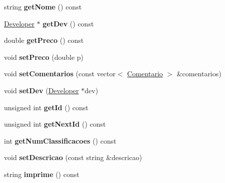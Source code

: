 \begin{DoxyCompactItemize}
\item 
\hypertarget{class_app_a7b94ca7878eb536a1d1b1448c2072bea}{string {\bfseries get\+Nome} () const }\label{class_app_a7b94ca7878eb536a1d1b1448c2072bea}

\item 
\hypertarget{class_app_a94de3c0569d8c300a634c5e058da70da}{\hyperlink{class_developer}{Developer} $\ast$ {\bfseries get\+Dev} () const }\label{class_app_a94de3c0569d8c300a634c5e058da70da}

\item 
\hypertarget{class_app_a203cc8ebea02cf4cabb736c3c4e8bc51}{double {\bfseries get\+Preco} () const }\label{class_app_a203cc8ebea02cf4cabb736c3c4e8bc51}

\item 
\hypertarget{class_app_ab9723a9ef1383d41b9960e07de4c5691}{void {\bfseries set\+Preco} (double p)}\label{class_app_ab9723a9ef1383d41b9960e07de4c5691}

\item 
\hypertarget{class_app_a40d8afcc9663054f4f5445a37dfd542d}{void {\bfseries set\+Comentarios} (const vector$<$ \hyperlink{class_comentario}{Comentario} $>$ \&comentarios)}\label{class_app_a40d8afcc9663054f4f5445a37dfd542d}

\item 
\hypertarget{class_app_aa2d4de1233b4a07def3cdae0d165d4cf}{void {\bfseries set\+Dev} (\hyperlink{class_developer}{Developer} $\ast$dev)}\label{class_app_aa2d4de1233b4a07def3cdae0d165d4cf}

\item 
\hypertarget{class_app_a17d1e4e52f2357b25437d21d21728bcb}{unsigned int {\bfseries get\+Id} () const }\label{class_app_a17d1e4e52f2357b25437d21d21728bcb}

\item 
\hypertarget{class_app_ae8bc0359346587f5e98885e4bdba3db0}{unsigned int {\bfseries get\+Next\+Id} () const }\label{class_app_ae8bc0359346587f5e98885e4bdba3db0}

\item 
\hypertarget{class_app_afca72f5119a5fbb1c7972d8085abc2c7}{int {\bfseries get\+Num\+Classificacoes} () const }\label{class_app_afca72f5119a5fbb1c7972d8085abc2c7}

\item 
\hypertarget{class_app_af0140ea32801ddf481e61fda65024ba8}{void {\bfseries set\+Descricao} (const string \&descricao)}\label{class_app_af0140ea32801ddf481e61fda65024ba8}

\item 
\hypertarget{class_app_af3a98845da9ba10769df22e1e21f3db0}{string {\bfseries imprime} () const }\label{class_app_af3a98845da9ba10769df22e1e21f3db0}

\end{DoxyCompactItemize}
